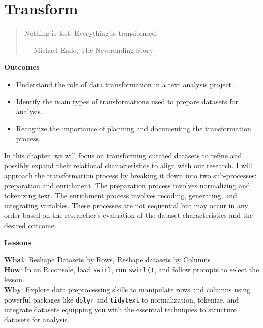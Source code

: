 \documentclass[
  letterpaper,
]{latex/krantz}
\providecommand{\tightlist}{%
  \setlength{\itemsep}{0pt}\setlength{\parskip}{0pt}}\usepackage{longtable,booktabs,array}
\theoremstyle{definition}
\theoremstyle{remark}
\begin{document}
\chapter{Transform}\label{sec-transform-chapter}

\begin{quote}
Nothing is lost. Everything is transformed.

--- Michael Ende, The Neverending Story
\end{quote}

\begin{tcolorbox}[enhanced jigsaw, colframe=quarto-callout-color-frame, breakable, bottomrule=.15mm, arc=.35mm, left=2mm, opacityback=0, rightrule=.15mm, colback=white, toprule=.15mm, leftrule=.75mm]

\textbf{ Outcomes}

\begin{itemize}
\tightlist
\item
  Understand the role of data transformation in a text analysis project.
\item
  Identify the main types of transformations used to prepare datasets
  for analysis.
\item
  Recognize the importance of planning and documenting the
  transformation process.
\end{itemize}

\end{tcolorbox}

In this chapter, we will focus on transforming curated datasets to
refine and possibly expand their relational characteristics to align
with our research. I will approach the transformation process by
breaking it down into two sub-processes: preparation and enrichment. The
preparation process involves normalizing and tokenizing text. The
enrichment process involves recoding, generating, and integrating
variables. These processes are not sequential but may occur in any order
based on the researcher's evaluation of the dataset characteristics and
the desired outcome.

\begin{tcolorbox}[enhanced jigsaw, colframe=quarto-callout-color-frame, breakable, bottomrule=.15mm, arc=.35mm, left=2mm, opacityback=0, rightrule=.15mm, colback=white, toprule=.15mm, leftrule=.75mm]

\textbf{ Lessons}

\textbf{What}: Reshape Datasets by Rows, Reshape datasets by Columns\\
\textbf{How}: In an R console, load \texttt{swirl}, run
\texttt{swirl()}, and follow prompts to select the lesson.\\
\textbf{Why}: Explore data preprocessing skills to manipulate rows and
columns using powerful packages like \texttt{dplyr} and
\texttt{tidytext} to normalization, tokenize, and integrate datasets
equipping you with the essential techniques to structure datasets for
analysis.

\end{tcolorbox}
\end{document}

